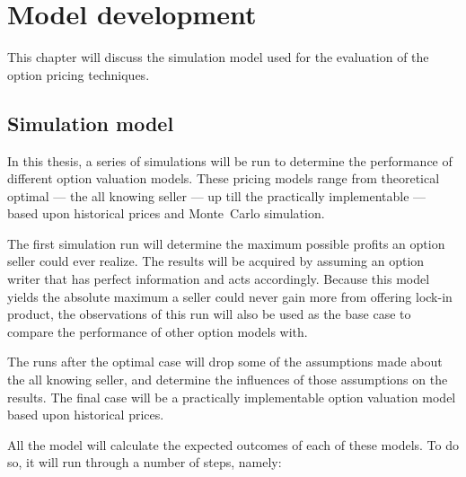 \chapter{Model development}
\label{chap:ModelDevelopment}
This chapter will discuss the simulation model used for the evaluation of the option pricing techniques.  

\section{Simulation model}
\label{sec:SimulationModel}
In this thesis, a series of simulations will be run to determine the performance of different option valuation models. These pricing models range from theoretical optimal --- the all knowing seller --- up till the practically implementable --- based upon historical prices and Monte~Carlo simulation.

The first simulation run will determine the maximum possible profits an option seller could ever realize. The results will be acquired by assuming an option writer that has perfect information and acts accordingly. Because this model yields the absolute maximum a seller could never gain more from offering lock-in product, the observations of this run will also be used as the base case to compare the performance of other option models with.

The runs after the optimal case will drop some of the assumptions made about the all knowing seller, and determine the influences of those assumptions on the results. The final case will be a practically implementable option valuation model based upon historical prices.

All the model will calculate the expected outcomes of each of these models. To do so, it will run through a number of steps, namely:

